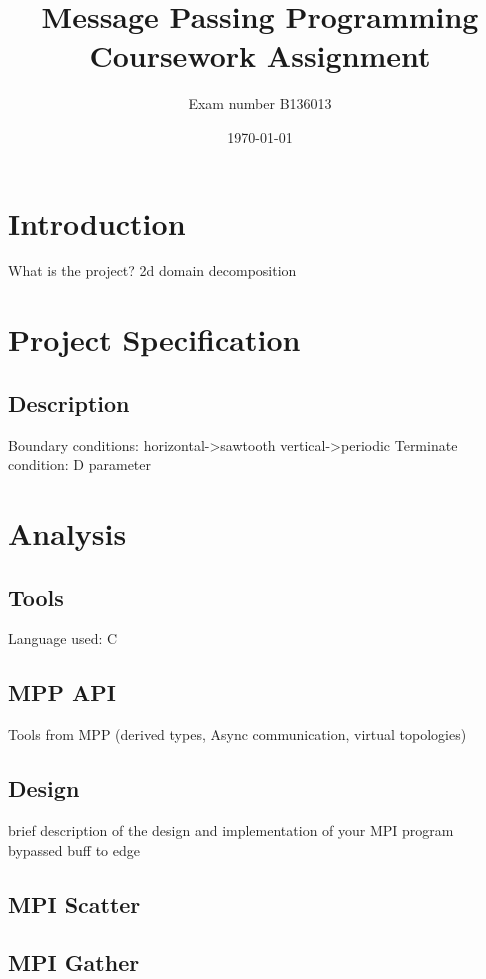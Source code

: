 \documentclass[12pt,a4paper]{article}
\newcommand{\sectionVspacing}{\vspace{15pt}}
\begin{document}
\title{Message Passing Programming Coursework Assignment}
\author{Exam number B136013}
\date{\today}

\makeEPCCtitle

\thispagestyle{empty}

\newpage
\clearpage

\tableofcontents

\newpage
\clearpage

\section{Introduction}
What is the project? 2d domain decomposition

\sectionVspacing

\section{Project Specification}
\subsection{Description}
Boundary conditions: horizontal->sawtooth vertical->periodic
Terminate condition: D parameter

\sectionVspacing

\section{Analysis}

\subsection{Tools}
Language used: C
\subsection{MPP API}
Tools from MPP (derived types, Async communication, virtual topologies)
\subsection{Design}
brief description of the design and implementation of your MPI program
bypassed buff to edge
\subsection{MPI Scatter}
\subsection{MPI Gather}
\end{document}
